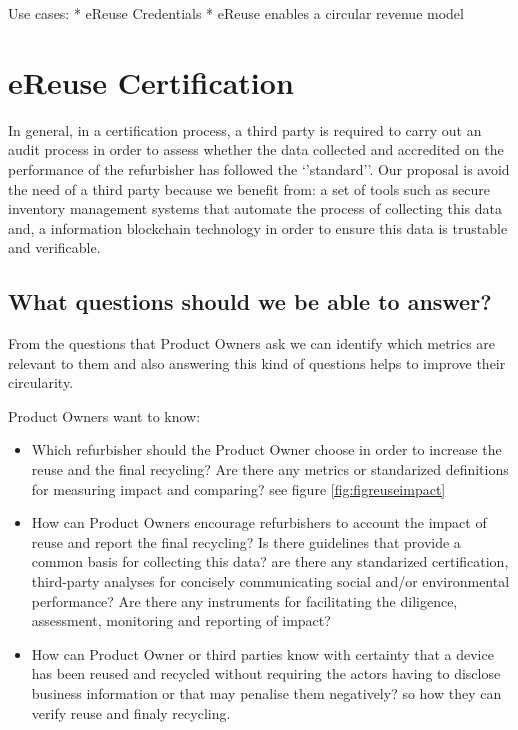 \documentclass[
]{book}
\providecommand{\tightlist}{%
  \setlength{\itemsep}{0pt}\setlength{\parskip}{0pt}}
\begin{document}
Use cases:
* eReuse Credentials
* eReuse enables a circular revenue model

\hypertarget{ereuse-certification}{%
\section{eReuse Certification}\label{ereuse-certification}}

In general, in a certification process, a third party is required to carry out an audit process in order to assess whether the data collected and accredited on the performance of the refurbisher has followed the `'standard''. Our proposal is avoid the need of a third party because we benefit from: a set of tools such as secure inventory management systems that automate the process of collecting this data and, a information blockchain technology in order to ensure this data is trustable and verificable.

\hypertarget{what-questions-should-we-be-able-to-answer}{%
\subsection{What questions should we be able to answer?}\label{what-questions-should-we-be-able-to-answer}}

From the questions that Product Owners ask we can identify which metrics are relevant to them and also answering this kind of questions helps to improve their circularity.

Product Owners want to know:

\begin{itemize}
\tightlist
\item
  Which refurbisher should the Product Owner choose in order to increase the reuse and the final recycling? Are there any metrics or standarized definitions for measuring impact and comparing? see figure \ref{fig:figreuseimpact}
\item
  How can Product Owners encourage refurbishers to account the impact of reuse and report the final recycling? Is there guidelines that provide a common basis for collecting this data? are there any standarized certification, third-party analyses for concisely communicating social and/or environmental performance? Are there any instruments for facilitating the diligence, assessment, monitoring and reporting of impact?
\item
  How can Product Owner or third parties know with certainty that a device has been reused and recycled without requiring the actors having to disclose business information or that may penalise them negatively? so how they can verify reuse and finaly recycling.
\end{itemize}
\end{document}
